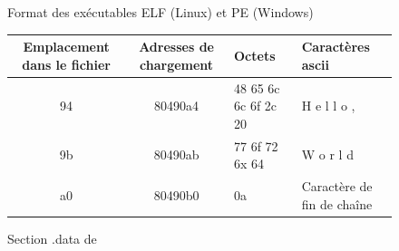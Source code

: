 \begin{figure}
\begin{center}
\end{center}
\caption{Format des exécutables ELF (Linux) et PE (Windows)}
\label{fig:structure_exe}
\end{figure}

\begin{figure}
\begin{center}
\begin{tabular}{|c|c|l|l|}
\hline
Emplacement dans le fichier & Adresses de chargement & Octets & Caractères ascii\\ 
\hline
94 & 80490a4 & 48 65 6c 6c 6f 2c 20 & H e l l o ,   \\
9b & 80490ab & 77 6f 72 6x 64 & W o r l d \\
a0 & 80490b0 & 0a & Caractère de fin de chaîne       \\
\hline
\end{tabular}
\end{center}
\caption{Section .data de \helloworld}
\label{fig:data_helloworld}
\end{figure}

